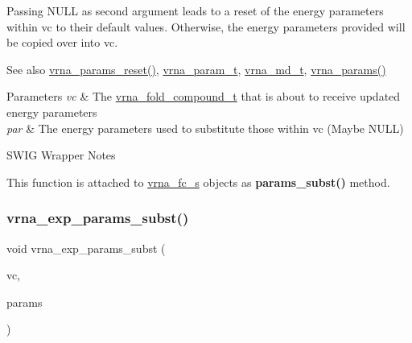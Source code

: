 Passing N\+U\+LL as second argument leads to a reset of the energy parameters within vc to their default values. Otherwise, the energy parameters provided will be copied over into vc.

\begin{DoxySeeAlso}{See also}
\hyperlink{group__energy__parameters_gac40dc82e48a72a97cfc58b9da08a7792}{vrna\+\_\+params\+\_\+reset()}, \hyperlink{group__energy__parameters_ga8a69ca7d787e4fd6079914f5343a1f35}{vrna\+\_\+param\+\_\+t}, \hyperlink{group__model__details_ga1f8a10e12a0a1915f2a4eff0b28ea17c}{vrna\+\_\+md\+\_\+t}, \hyperlink{group__energy__parameters_gad0e3e7e74bdc50d1709d40c92993185e}{vrna\+\_\+params()}
\end{DoxySeeAlso}

\begin{DoxyParams}{Parameters}
{\em vc} & The \hyperlink{group__fold__compound_ga1b0cef17fd40466cef5968eaeeff6166}{vrna\+\_\+fold\+\_\+compound\+\_\+t} that is about to receive updated energy parameters \\
\hline
{\em par} & The energy parameters used to substitute those within vc (Maybe N\+U\+LL)\\
\hline
\end{DoxyParams}
\begin{DoxyRefDesc}{S\+W\+I\+G Wrapper Notes}
\item[\hyperlink{wrappers__wrappers000079}{S\+W\+I\+G Wrapper Notes}]This function is attached to \hyperlink{group__fold__compound_structvrna__fc__s}{vrna\+\_\+fc\+\_\+s} objects as {\bfseries params\+\_\+subst()} method. \end{DoxyRefDesc}
\mbox{\label{group__energy__parameters_ga8e7ac4fab3b0cc03afbc134eaafb3525}} 
\subsubsection{\texorpdfstring{vrna\+\_\+exp\+\_\+params\+\_\+subst()}{vrna\_exp\_params\_subst()}}
{\footnotesize\ttfamily void vrna\+\_\+exp\+\_\+params\+\_\+subst (\begin{DoxyParamCaption}\item[{\hyperlink{group__fold__compound_ga1b0cef17fd40466cef5968eaeeff6166}{vrna\+\_\+fold\+\_\+compound\+\_\+t} $\ast$}]{vc,  }\item[{\hyperlink{group__energy__parameters_ga01d8b92fe734df8d79a6169482c7d8d8}{vrna\+\_\+exp\+\_\+param\+\_\+t} $\ast$}]{params }\end{DoxyParamCaption})}



